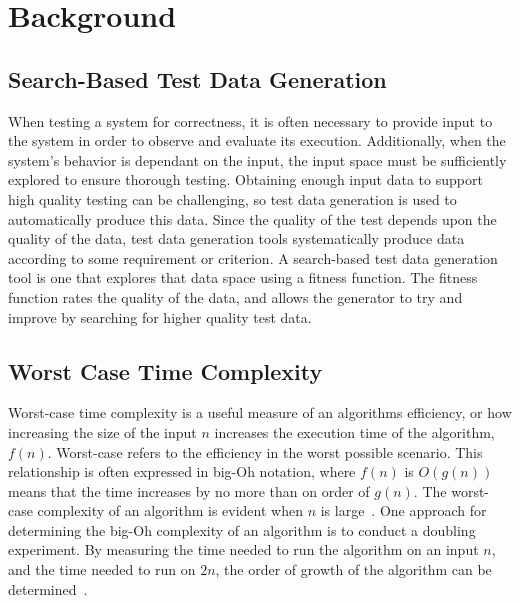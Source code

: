 
\section{Background}


\subsection{Search-Based Test Data Generation}

When testing a system for correctness, it is often necessary to provide input to the system in order to observe and
evaluate its execution. Additionally, when the system's behavior is dependant on the input, the input space must be
sufficiently explored to ensure thorough testing.  Obtaining enough input data to support high quality testing can be
challenging, so test data generation is used to automatically produce this data. Since the quality of the test depends
upon the quality of the data, test data generation tools systematically produce data according to some requirement or
criterion. A search-based test data generation tool is one that explores that data space using a fitness function.  The
fitness function rates the quality of the data, and allows the generator to try and improve by searching for higher
quality test data.



\subsection{Worst Case Time Complexity}

Worst-case time complexity is a useful measure of an algorithms efficiency, or how increasing the size of the input $n$
increases the execution time of the algorithm, $f(n)$.  Worst-case refers to the efficiency in the worst possible
scenario.  This relationship is often expressed in big-Oh notation, where $f(n)$ is $O(g(n))$ means that the time
increases by no more than on order of $g(n)$. The worst-case complexity of an algorithm is evident when $n$ is
large~\cite{Goodrich2014}. One approach for determining the big-Oh complexity of an algorithm is to conduct a doubling
experiment. By measuring the time needed to run the algorithm on an input $n$, and the time needed to run on $2n$, the
order of growth of the algorithm can be determined~\cite{McGeoch2012,Sedgewick1998}.

